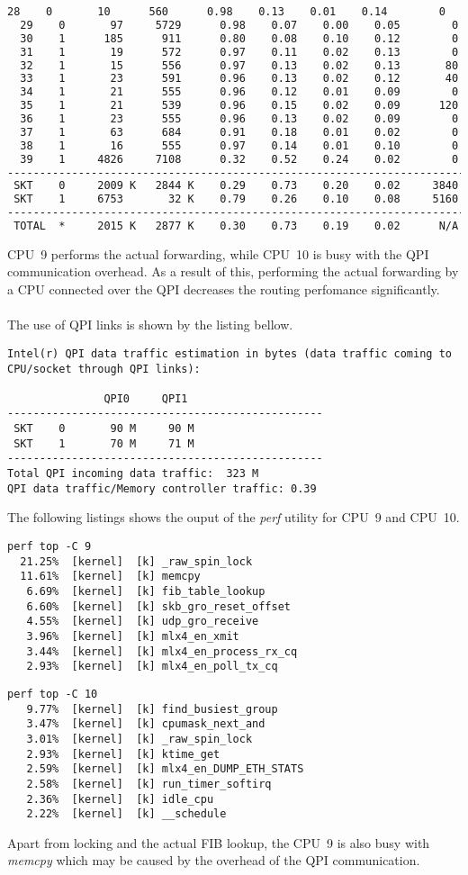 \begin{lstlisting}[language=TeX]
  28    0       10      560      0.98    0.13    0.01    0.14        0
  29    0       97     5729      0.98    0.07    0.00    0.05        0
  30    1      185      911      0.80    0.08    0.10    0.12        0
  31    1       19      572      0.97    0.11    0.02    0.13        0
  32    1       15      556      0.97    0.13    0.02    0.13       80
  33    1       23      591      0.96    0.13    0.02    0.12       40
  34    1       21      555      0.96    0.12    0.01    0.09        0
  35    1       21      539      0.96    0.15    0.02    0.09      120
  36    1       23      555      0.96    0.13    0.02    0.09        0
  37    1       63      684      0.91    0.18    0.01    0.02        0
  38    1       16      555      0.97    0.14    0.01    0.10        0
  39    1     4826     7108      0.32    0.52    0.24    0.02        0
------------------------------------------------------------------------
 SKT    0     2009 K   2844 K    0.29    0.73    0.20    0.02     3840
 SKT    1     6753       32 K    0.79    0.26    0.10    0.08     5160
------------------------------------------------------------------------
 TOTAL  *     2015 K   2877 K    0.30    0.73    0.19    0.02      N/A
\end{lstlisting}
CPU~9 performs the actual forwarding, while CPU~10
is busy with the QPI communication overhead.
As a result of this, performing the actual forwarding
by a CPU connected over the QPI decreases the routing perfomance significantly.
\\
\\
The use of QPI links is shown by the listing bellow.
\begin{lstlisting}
Intel(r) QPI data traffic estimation in bytes (data traffic coming to CPU/socket through QPI links):

               QPI0     QPI1
-------------------------------------------------
 SKT    0       90 M     90 M
 SKT    1       70 M     71 M
-------------------------------------------------
Total QPI incoming data traffic:  323 M
QPI data traffic/Memory controller traffic: 0.39
\end{lstlisting}
The following listings shows the ouput of the {\it{perf}} utility for CPU~9 and CPU~10.
\begin{lstlisting}
perf top -C 9
  21.25%  [kernel]  [k] _raw_spin_lock
  11.61%  [kernel]  [k] memcpy
   6.69%  [kernel]  [k] fib_table_lookup
   6.60%  [kernel]  [k] skb_gro_reset_offset
   4.55%  [kernel]  [k] udp_gro_receive
   3.96%  [kernel]  [k] mlx4_en_xmit
   3.44%  [kernel]  [k] mlx4_en_process_rx_cq
   2.93%  [kernel]  [k] mlx4_en_poll_tx_cq
\end{lstlisting}
\begin{lstlisting}
perf top -C 10
   9.77%  [kernel]  [k] find_busiest_group
   3.47%  [kernel]  [k] cpumask_next_and
   3.01%  [kernel]  [k] _raw_spin_lock
   2.93%  [kernel]  [k] ktime_get
   2.59%  [kernel]  [k] mlx4_en_DUMP_ETH_STATS
   2.58%  [kernel]  [k] run_timer_softirq
   2.36%  [kernel]  [k] idle_cpu
   2.22%  [kernel]  [k] __schedule
\end{lstlisting}
Apart from locking and the actual FIB lookup,
the CPU~9 is also busy with {\it{memcpy}} which may be caused by the overhead of the QPI communication.
